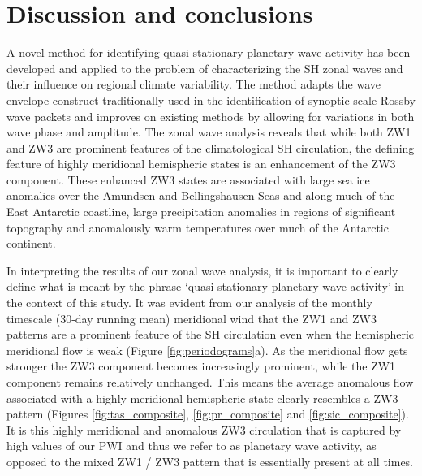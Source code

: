 \section{Discussion and conclusions}

A novel method for identifying quasi-stationary planetary wave activity has been developed and applied to the problem of characterizing the SH zonal waves and their influence on regional climate variability. The method adapts the wave envelope construct traditionally used in the identification of synoptic-scale Rossby wave packets and improves on existing methods by allowing for variations in both wave phase and amplitude. The zonal wave analysis reveals that while both ZW1 and ZW3 are prominent features of the climatological SH circulation, the defining feature of highly meridional hemispheric states is an enhancement of the ZW3 component. These enhanced ZW3 states are associated with large sea ice anomalies over the Amundsen and Bellingshausen Seas and along much of the East Antarctic coastline, large precipitation anomalies in regions of significant topography and anomalously warm temperatures over much of the Antarctic continent. 

In interpreting the results of our zonal wave analysis, it is important to clearly define what is meant by the phrase `quasi-stationary planetary wave activity' in the context of this study. It was evident from our analysis of the monthly timescale (30-day running mean) meridional wind that the ZW1 and ZW3 patterns are a prominent feature of the SH circulation even when the hemispheric meridional flow is weak (Figure \ref{fig:periodograms}a). As the meridional flow gets stronger the ZW3 component becomes increasingly prominent, while the ZW1 component remains relatively unchanged. This means the average anomalous flow associated with a highly meridional hemispheric state clearly resembles a ZW3 pattern (Figures \ref{fig:tas_composite}, \ref{fig:pr_composite} and \ref{fig:sic_composite}). It is this highly meridional and anomalous ZW3 circulation that is captured by high values of our PWI and thus we refer to as planetary wave activity, as opposed to the mixed ZW1 / ZW3 pattern that is essentially present at all times.  

